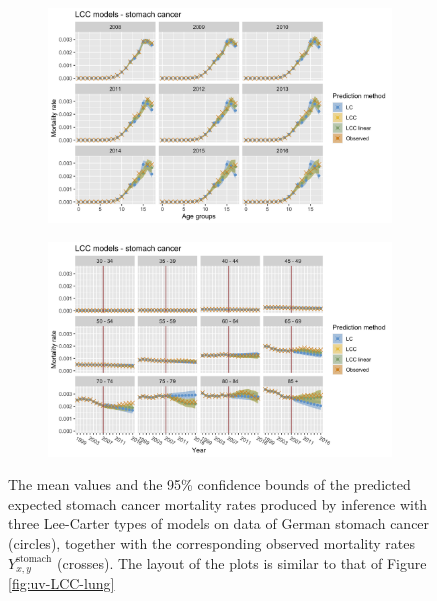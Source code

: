 \begin{figure}[h!]
    \centering
    \begin{subfigure}[b]{.75\linewidth}
        \includegraphics[width=\linewidth]{real-data/real-data-univariate/Figures/univariate-LCC-by-age-stomach.png}
    \end{subfigure}
    
    \begin{subfigure}[b]{.75\linewidth}
        \includegraphics[width=\linewidth]{real-data/real-data-univariate/Figures/univariate-LCC-by-period-stomach.png}
    \end{subfigure}
    \caption{The mean values and the 95\% confidence bounds of the predicted expected stomach cancer mortality rates produced by inference with three Lee-Carter types of models on data of German stomach cancer (circles), together with the corresponding observed mortality rates $Y_{x,y}^{\text{stomach}}$ (crosses). The layout of the plots is similar to that of Figure \ref{fig:uv-LCC-lung}}
    \label{fig:uv-LCC-stomach}
\end{figure}

